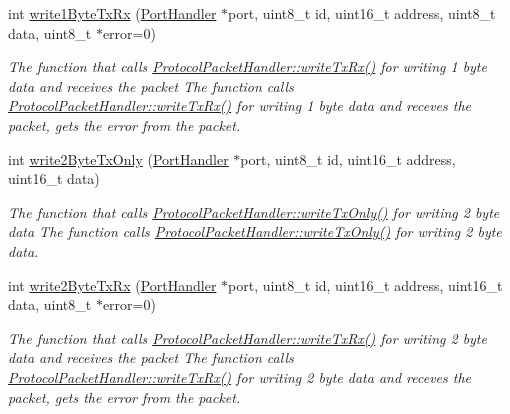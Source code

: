 \begin{DoxyCompactItemize}
int \hyperlink{classmercury_1_1_protocol_packet_handler_a707d577c37240db5de018f154a9a0fec}{write1\+Byte\+Tx\+Rx} (\hyperlink{classmercury_1_1_port_handler}{Port\+Handler} $\ast$port, uint8\+\_\+t id, uint16\+\_\+t address, uint8\+\_\+t data, uint8\+\_\+t $\ast$error=0)
\begin{DoxyCompactList}\small\item\em The function that calls \hyperlink{classmercury_1_1_protocol_packet_handler_a13921f2ddae0c1f1f7ac3669d1a15470}{Protocol\+Packet\+Handler\+::write\+Tx\+Rx()} for writing 1 byte data and receives the packet  The function calls \hyperlink{classmercury_1_1_protocol_packet_handler_a13921f2ddae0c1f1f7ac3669d1a15470}{Protocol\+Packet\+Handler\+::write\+Tx\+Rx()} for writing 1 byte data and receves the packet,  gets the error from the packet. \end{DoxyCompactList}\item 
int \hyperlink{classmercury_1_1_protocol_packet_handler_a80a1fe6d22afe8878b23d123e2c77070}{write2\+Byte\+Tx\+Only} (\hyperlink{classmercury_1_1_port_handler}{Port\+Handler} $\ast$port, uint8\+\_\+t id, uint16\+\_\+t address, uint16\+\_\+t data)
\begin{DoxyCompactList}\small\item\em The function that calls \hyperlink{classmercury_1_1_protocol_packet_handler_adf6e96b412135484dac0ff7ff9c2bf36}{Protocol\+Packet\+Handler\+::write\+Tx\+Only()} for writing 2 byte data  The function calls \hyperlink{classmercury_1_1_protocol_packet_handler_adf6e96b412135484dac0ff7ff9c2bf36}{Protocol\+Packet\+Handler\+::write\+Tx\+Only()} for writing 2 byte data. \end{DoxyCompactList}\item 
int \hyperlink{classmercury_1_1_protocol_packet_handler_a59919f414dc8f1b0d024af5df3189294}{write2\+Byte\+Tx\+Rx} (\hyperlink{classmercury_1_1_port_handler}{Port\+Handler} $\ast$port, uint8\+\_\+t id, uint16\+\_\+t address, uint16\+\_\+t data, uint8\+\_\+t $\ast$error=0)
\begin{DoxyCompactList}\small\item\em The function that calls \hyperlink{classmercury_1_1_protocol_packet_handler_a13921f2ddae0c1f1f7ac3669d1a15470}{Protocol\+Packet\+Handler\+::write\+Tx\+Rx()} for writing 2 byte data and receives the packet  The function calls \hyperlink{classmercury_1_1_protocol_packet_handler_a13921f2ddae0c1f1f7ac3669d1a15470}{Protocol\+Packet\+Handler\+::write\+Tx\+Rx()} for writing 2 byte data and receves the packet,  gets the error from the packet. \end{DoxyCompactList}\item 

\end{DoxyCompactItemize}
